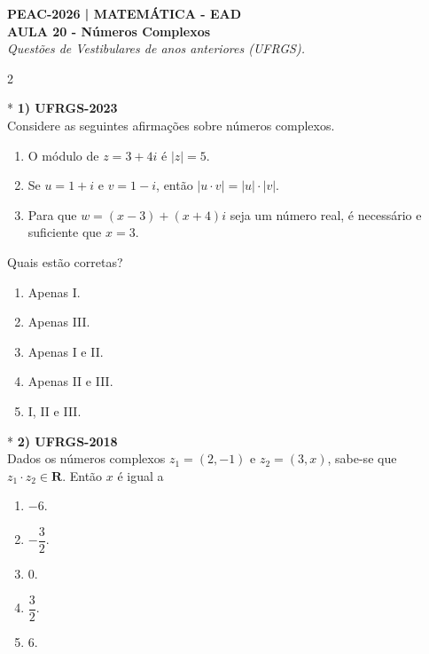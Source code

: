 \documentclass[11pt,a4paper]{article}
\begin{document}
\begin{center}
    \textbf{\Large PEAC-2026 | MATEMÁTICA - EAD} \\[0.2cm]
    \textbf{\large AULA 20 - Números Complexos} \\[0.2cm]
    \textit{Questões de Vestibulares de anos anteriores (UFRGS).}
\end{center}
\vspace{0.5cm}

\begin{paracol}{2}


    \switchcolumn[0]*
    \textbf{1) UFRGS-2023} \\
    Considere as seguintes afirmações sobre números complexos.

    \begin{enumerate}[label=\Roman*., itemsep=0.2cm]
        \item O módulo de $z = 3 + 4i$ é $|z| = 5$.
        \item Se $u = 1 + i$ e $v = 1 - i$, então $|u \cdot v| = |u| \cdot |v|$.
        \item Para que $w = (x - 3) + (x + 4)i$ seja um número real, é necessário e suficiente que $x = 3$.
    \end{enumerate}

    Quais estão corretas?

    \begin{enumerate}[label=(\Alph*)]
        \item Apenas I.
        \item Apenas III.
        \item Apenas I e II.
        \item Apenas II e III.
        \item I, II e III.
    \end{enumerate}
    \vspace{0.4cm}

    \switchcolumn[1]
    \vspace{8cm}

    \switchcolumn[0]*
    \textbf{2) UFRGS-2018} \\
    Dados os números complexos $z_1 = (2, -1)$ e $z_2 = (3, x)$, sabe-se que $z_1 \cdot z_2 \in \mathbf{R}$. Então $x$ é igual a

    \begin{enumerate}[label=(\Alph*), itemsep=0.2cm]
        \item $-6$.
        \item $-\dfrac{3}{2}$.
        \item $0$.
        \item $\dfrac{3}{2}$.
        \item $6$.
    \end{enumerate}
    \vspace{0.4cm}


\end{paracol}
\end{document}

